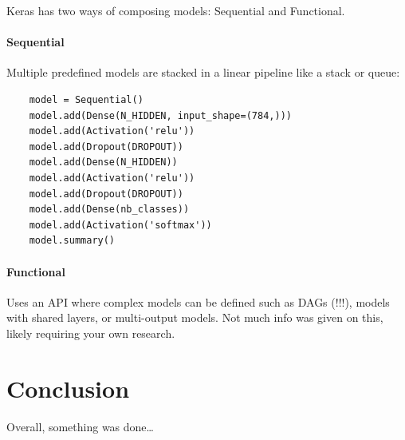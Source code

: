 \documentclass[12pt]{report}
\newcommand{\para}{\vspace{7pt}\noindent}
\begin{document}
\para Keras has two ways of composing models: Sequential and Functional.
\vspace{10pt}
\subsubsection{Sequential}
Multiple predefined models are stacked in a linear pipeline like a stack or queue:

\begin{verbatim}
    model = Sequential()
    model.add(Dense(N_HIDDEN, input_shape=(784,)))
    model.add(Activation('relu'))
    model.add(Dropout(DROPOUT))
    model.add(Dense(N_HIDDEN))
    model.add(Activation('relu'))
    model.add(Dropout(DROPOUT))
    model.add(Dense(nb_classes))
    model.add(Activation('softmax'))
    model.summary()
\end{verbatim}

\subsubsection{Functional}
Uses an API where complex models can be defined such as DAGs (!!!), models with shared layers, 
or multi-output models. Not much info was given on this, likely requiring your own research.


\chapter*{Conclusion}

Overall, something was done\dots
\end{document}
